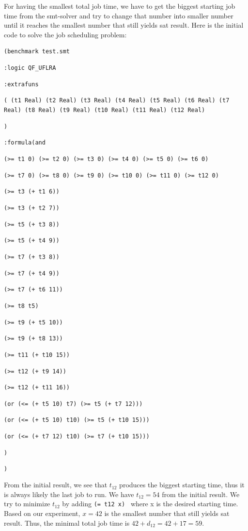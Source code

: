 \documentclass[12pt]{article}
\begin{document}
For having the smallest total job time, we have to get the biggest starting job time from the smt-solver and try to change that number into smaller number until it reaches the smallest number that still yields sat result. Here is the initial code to solve the job scheduling problem: 
{\footnotesize

{\tt (benchmark test.smt }

{\tt :logic QF\_UFLRA }

{\tt :extrafuns }

{\tt ( (t1 Real) (t2 Real) (t3 Real) (t4 Real) (t5 Real) (t6 Real) (t7 Real) (t8 Real) (t9 Real) (t10 Real) (t11 Real) (t12 Real) }

{\tt ) }

{\tt :formula(and  }

{\tt (>= t1 0)  (>= t2 0)  (>= t3 0)  (>= t4 0)  (>= t5 0)  (>= t6 0) }

{\tt (>= t7 0)  (>= t8 0)  (>= t9 0)  (>= t10 0)  (>= t11 0)  (>= t12 0) }

{\tt (>= t3 (+ t1 6)) }

{\tt (>= t3 (+ t2 7)) }

{\tt (>= t5 (+ t3 8)) }

{\tt (>= t5 (+ t4 9)) }

{\tt (>= t7 (+ t3 8)) }

{\tt (>= t7 (+ t4 9)) }

{\tt (>= t7 (+ t6 11)) }

{\tt (>= t8 t5) }

{\tt (>= t9 (+ t5 10)) }

{\tt (>= t9 (+ t8 13)) }

{\tt (>= t11 (+ t10 15)) }

{\tt (>= t12 (+ t9 14)) }

{\tt (>= t12 (+ t11 16)) }

{\tt (or (<= (+ t5 10) t7) (>= t5 (+ t7 12))) }

{\tt (or (<= (+ t5 10) t10) (>= t5 (+ t10 15))) }

{\tt (or (<= (+ t7 12) t10) (>= t7 (+ t10 15))) }

{\tt  }

{\tt   }

{\tt  }

{\tt ) }

{\tt  }

{\tt ) }
	
}
From the initial result, we see that $t_{12}$ produces the biggest starting time, thus it is always likely the last job to run. We have $t_{12}=54$ from the initial result. We try to minimize $t_{12}$ by adding {\tt (= t12 x) } where x is the desired starting time. Based on our experiment, $x=42$ is the smallest number that still yields sat result. Thus, the minimal total job time is $42+d_{12}=42+17=59$.
\end{document}
